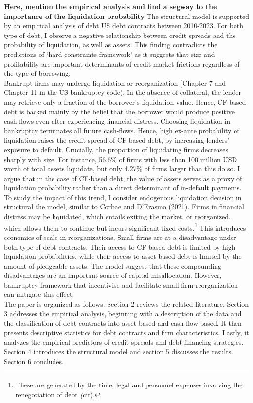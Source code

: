 \documentclass[12pt]{article}
\begin{document}
\textbf{Here, mention the empirical analysis and find a segway to the importance of the liquidation probability} The structural model is supported by an empirical analysis of debt US debt contracts between 2010-2023. For both type of debt, I observe a negative relationship between credit spreads and the probability of liquidation, as well as assets. This finding contradicts the predictions of `hard constraints framework' as it suggests that size and profitability are important determinants of credit market frictions regardless of the type of borrowing. \vspace{3mm} \\
Bankrupt firms may undergo liquidation or reorganization (Chapter 7 and Chapter 11 in the US bankruptcy code). In the absence of collateral, the lender may retrieve only a fraction of the borrower's liquidation value. Hence, CF-based debt is backed mainly by the belief that the borrower would produce positive cash-flows even after experiencing financial distress. Choosing liquidation in bankruptcy terminates all future cash-flows. Hence, high ex-ante probability of liquidation raises the credit spread of CF-based debt, by increasing lenders' exposure to default. Crucially, the proportion of liquidating firms decreases sharply with size. For instance, 56.6\% of firms with less than 100 million USD worth of total assets liquidate, but only 4.27\% of firms larger than this do so. I argue that in the case of CF-based debt, the value of assets serves as a proxy of liquidation probability rather than a direct determinant of in-default payments. \vspace*{3mm} \\ 
To study the impact of this trend, I consider endogenous liquidation decision in structural the model, similar to Corbae and D'Erasmo (2021). Firms in financial distress may  be liquidated, which entails exiting the market, or reorganized, which allows them to continue but incurs significant fixed costs.\footnote{These are generated by the time, legal and personnel expenses involving the renegotiation of debt \textit(cit).} This introduces economies of scale in reorganizations. Small firms are at a disadvantage under both type of debt contracts. Their access to CF-based debt is limited by high liquidation probabilities, while their access to asset based debt is limited by the amount of pledgeable assets. The model suggest that these compounding disadvantages are an important source of capital misallocation. However, bankruptcy framework that incentivise and facilitate small firm reorganization can mitigate this effect. \vspace*{3mm} \\
The paper is organized as follows. Section 2 reviews the related literature. Section 3 addresses the empirical analysis, beginning with a description of the data and the classification of debt contracts into asset-based and cash flow-based. It then presents descriptive statistics for debt contracts and firm characteristics. Lastly, it analyzes the empirical predictors of credit spreads and debt financing strategies. Section 4 introduces the structural model and section 5 discusses the results. Section 6 concludes.
\end{document}
